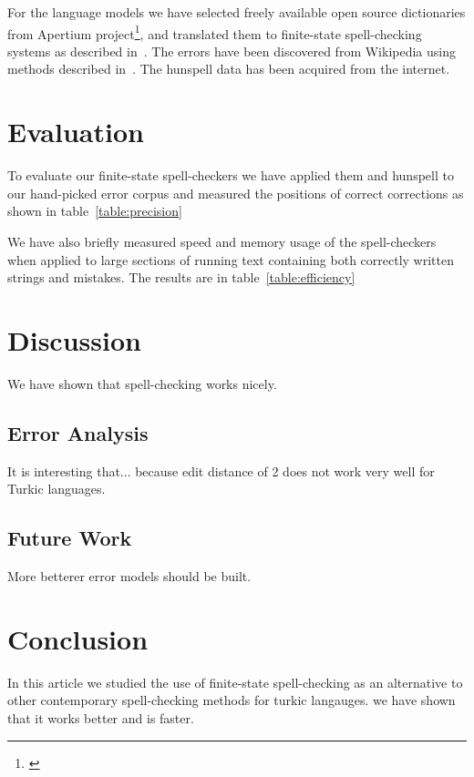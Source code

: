 \documentclass[a5paper]{article}
\begin{document}
For the language models we have selected freely available open source dictionaries
from Apertium project\footnote{\url{}}, and translated them to finite-state
spell-checking systems as described in~\cite{pirinen2012compiling}. The
errors have been discovered from Wikipedia using methods described 
in~\cite{max2010mining}. The hunspell data has been acquired from the internet.


\section{Evaluation}

To evaluate our finite-state spell-checkers we have applied them and hunspell
to our hand-picked error corpus and measured the positions of correct
corrections as shown in table~\ref{table:precision}

We have also briefly measured speed and memory usage of the spell-checkers when
applied to large sections of running text containing both correctly written
strings and mistakes. The results are in table~\ref{table:efficiency}

\section{Discussion}

We have shown that spell-checking works nicely.

\subsection{Error Analysis}

It is interesting that... because edit distance of 2 does not work very well
for Turkic languages.

\subsection{Future Work}

More betterer error models should be built.

\section{Conclusion}

In this article we studied the use of finite-state spell-checking as an
alternative to other contemporary spell-checking methods for turkic langauges.
we have shown that it works better and is faster. 



\end{document}
